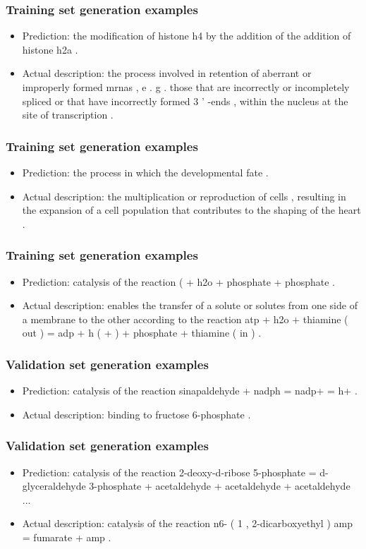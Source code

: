 \documentclass{beamer}
\begin{document}
\begin{frame}
\frametitle{Training set generation examples}
\begin{itemize}
\item Prediction: the modification of histone h4 by the addition of the addition of histone h2a .
\item Actual description: the process involved in retention of aberrant or improperly formed mrnas , e . g . those that are incorrectly or incompletely spliced or that have incorrectly formed 3 ' -ends , within the nucleus at the site of transcription .
\end{itemize}
\end{frame}

\begin{frame}
\frametitle{Training set generation examples}
\begin{itemize}
\item Prediction:  the process in which the developmental fate .
\item Actual description: the multiplication or reproduction of cells , resulting in the expansion of a cell population that contributes to the shaping of the heart .
\end{itemize}
\end{frame}

\begin{frame}
\frametitle{Training set generation examples}
\begin{itemize}
\item Prediction:  catalysis of the reaction ( + h2o + phosphate + phosphate .
\item Actual description: enables the transfer of a solute or solutes from one side of a membrane to the other according to the reaction atp + h2o + thiamine ( out ) = adp + h ( + ) + phosphate + thiamine ( in ) .
\end{itemize}
\end{frame}

\begin{frame}
\frametitle{Validation set generation examples}
\begin{itemize}
\item Prediction: catalysis of the reaction sinapaldehyde + nadph = nadp+ = h+ .
\item Actual description: binding to fructose 6-phosphate .
\end{itemize}
\end{frame}

\begin{frame}
\frametitle{Validation set generation examples}
\begin{itemize}
\item Prediction: catalysis of the reaction 2-deoxy-d-ribose 5-phosphate = d-glyceraldehyde 3-phosphate + acetaldehyde + acetaldehyde + acetaldehyde ...
\item Actual description: catalysis of the reaction n6- ( 1 , 2-dicarboxyethyl ) amp = fumarate + amp .
\end{itemize}
\end{frame}
\end{document}

